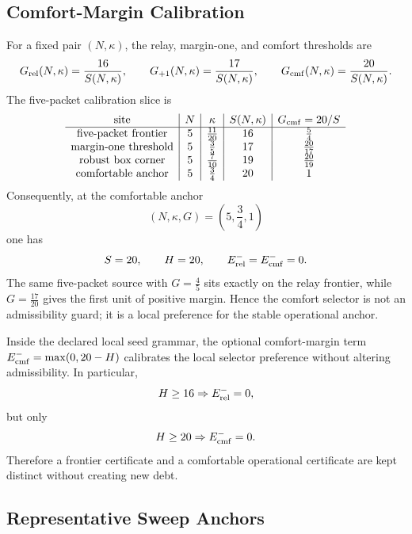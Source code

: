 \subsection{Comfort-Margin Calibration}
\label{subsec:r33-comfort-margin-calibration}

For a fixed pair \((N,\kappa)\), the relay, margin-one, and comfort thresholds
are
\[
G_{\rm rel}(N,\kappa)=\frac{16}{S(N,\kappa)},
\qquad
G_{+1}(N,\kappa)=\frac{17}{S(N,\kappa)},
\qquad
G_{\rm cmf}(N,\kappa)=\frac{20}{S(N,\kappa)}.
\]
The five-packet calibration slice is
\[
\begin{array}{c|c|c|c|c}
\text{site} & N & \kappa & S(N,\kappa) & G_{\rm cmf}=20/S\\
\hline
\text{five-packet frontier} & 5 & \frac{11}{20} & 16 & \frac{5}{4}\\
\text{margin-one threshold} & 5 & \frac{3}{5} & 17 & \frac{20}{17}\\
\text{robust box corner} & 5 & \frac{7}{10} & 19 & \frac{20}{19}\\
\text{comfortable anchor} & 5 & \frac{3}{4} & 20 & 1\\
\end{array}
\]
Consequently, at the comfortable anchor
\[
(N,\kappa,G)=\left(5,\frac34,1\right)
\]
one has
\[
S=20,
\qquad
H=20,
\qquad
E_{\rm rel}^{-}=E_{\rm cmf}^{-}=0.
\]
The same five-packet source with \(G=\frac45\) sits exactly on the relay
frontier, while \(G=\frac{17}{20}\) gives the first unit of positive
margin.  Hence the comfort selector is not an admissibility guard; it is a
local preference for the stable operational anchor.

\begin{lemma}
\label{lem:r33-comfort-margin-calibration}
Inside the declared local seed grammar, the optional comfort-margin term
\(E_{\rm cmf}^{-}=\max(0,20-H)\) calibrates the local selector preference
without altering admissibility.  In particular,
\[
H\geq16\Rightarrow E_{\rm rel}^{-}=0,
\]
but only
\[
H\geq20\Rightarrow E_{\rm cmf}^{-}=0.
\]
Therefore a frontier certificate and a comfortable operational certificate are
kept distinct without creating new debt.
\end{lemma}

\subsection{Representative Sweep Anchors}
\label{subsec:r33-representative-sweep-anchors}

